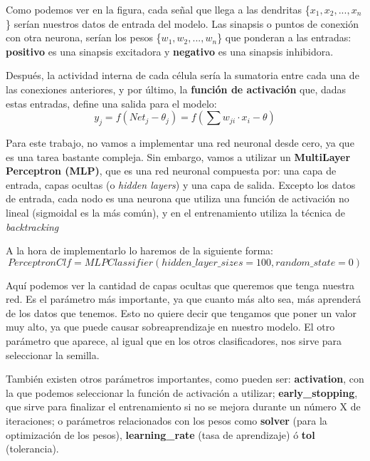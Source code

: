 \documentclass[11pt,a4paper]{article}
\begin{document}
Como podemos ver en la figura, cada señal que llega a las dendritas \{$x_1,x_2,...,x_n$\} serían nuestros datos de entrada
del modelo. Las sinapsis o puntos de conexión con otra neurona, serían los pesos \{$w_1,w_2,...,w_n$\} que ponderan a las
entradas: \textbf{positivo} es una sinapsis excitadora y \textbf{negativo} es una sinapsis inhibidora.

Después, la actividad interna de cada célula sería la sumatoria entre cada una de las conexiones anteriores, y por último, la
\textbf{función de activación} que, dadas estas entradas, define una salida para el modelo:
$$y_j = f(Net_j - \theta_j) = f(\sum w_{ji} \cdot x_i - \theta)$$

Para este trabajo, no vamos a implementar una red neuronal desde cero, ya que es una tarea bastante compleja. Sin embargo,
vamos a utilizar un \textbf{MultiLayer Perceptron (MLP)}, que es una red neuronal compuesta por: una capa de entrada, capas
ocultas (o \textit{hidden layers}) y una capa de salida. Excepto los datos de entrada, cada nodo es una neurona que utiliza
una función de activación no lineal (sigmoidal es la más común), y en el entrenamiento utiliza la técnica de \textit{backtracking}

A la hora de implementarlo lo haremos de la siguiente forma:
$$PerceptronClf = MLPClassifier(hidden\_layer\_sizes=100, random\_state=0)$$

Aquí podemos ver la cantidad de capas ocultas que queremos que tenga nuestra red. Es el parámetro más importante, ya que
cuanto más alto sea, más aprenderá de los datos que tenemos. Esto no quiere decir que tengamos que poner un valor muy alto,
ya que puede causar sobreaprendizaje en nuestro modelo. El otro parámetro que aparece, al igual que en los otros clasificadores,
nos sirve para seleccionar la semilla.

También existen otros parámetros importantes, como pueden ser: \textbf{activation}, con la que podemos seleccionar la función
de activación a utilizar; \textbf{early\_stopping}, que sirve para finalizar el entrenamiento si no se mejora durante un número
X de iteraciones; o parámetros relacionados con los pesos como \textbf{solver} (para la optimización de los pesos), \textbf{
learning\_rate} (tasa de aprendizaje) ó \textbf{tol} (tolerancia).
\end{document}
